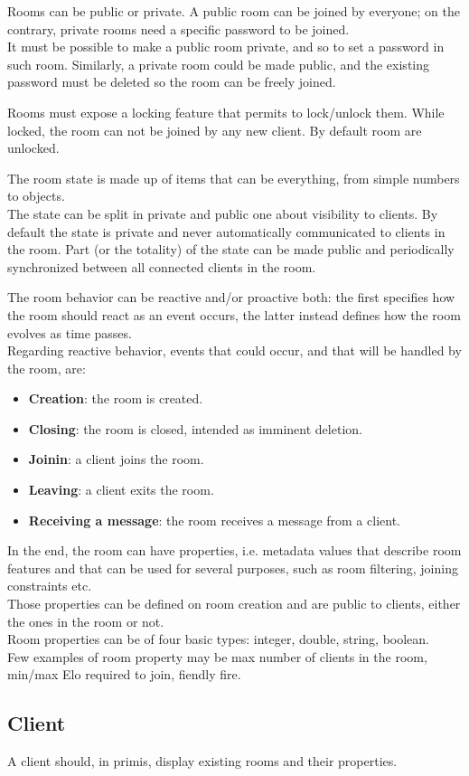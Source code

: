 \bigskip
Rooms can be public or private. A public room can be joined by everyone; on the contrary, private rooms need a specific password to be joined.
\\
It must be possible to make a public room private, and so to set a password in such room. Similarly, a private room could be made public, and the existing password must be deleted so the room can be freely joined.   

\bigskip
Rooms must expose a locking feature that permits to lock/unlock them. While locked, the room can not be joined by any new client. By default room are unlocked.

\bigskip
The room state is made up of items that can be everything, from simple numbers to objects.   
\\
The state can be split in private and public one about visibility to clients. By default the state is private and never automatically communicated to clients in the room. Part (or the totality) of the state can be made public and periodically synchronized between all connected clients in the room.

\bigskip
The room behavior can be reactive and/or proactive both: the first specifies how the room should react as an event occurs, the latter instead defines how the room evolves as time passes.
\\
Regarding reactive behavior, events that could occur, and that will be handled by the room, are:
\begin{itemize}
\item \textbf{Creation}: the room is created.
\item \textbf{Closing}: the room is closed, intended as imminent deletion.
\item \textbf{Joinin}: a client joins the room.
\item \textbf{Leaving}: a client exits the room.
\item \textbf{Receiving a message}: the room receives a message from a client.
\end{itemize} 
  
In the end, the room can have properties, i.e. metadata values that describe room features and that can be used for several purposes, such as room filtering, joining constraints etc.
\\
Those properties can be defined on room creation and are public to clients, either the ones in the room or not.
\\
Room properties can be of four basic types: integer, double, string, boolean. 
\\
Few examples of room property may be max number of clients in the room, min/max Elo required to join, fiendly fire.


\subsection{Client}

A client should, in primis, display existing rooms and their properties.  

